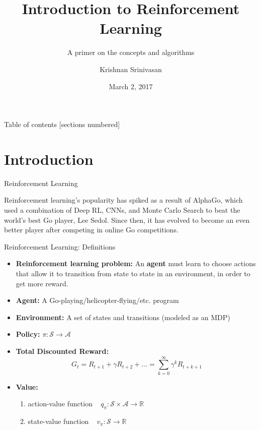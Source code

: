 \documentclass[10pt]{beamer}
\title{Introduction to Reinforcement Learning}
\subtitle{A primer on the concepts and algorithms}
\date{March 2, 2017}
\author{Krishnan Srinivasan}
\institute{Yale University}
\begin{document}
\maketitle

\begin{frame}{Table of contents}
  [sections numbered]
  \tableofcontents[hideallsubsections]
\end{frame}

\section{Introduction}

\begin{frame}{Reinforcement Learning}

  Reinforcement learning's popularity has spiked as a result of AlphaGo,
  which used a combination of Deep RL, CNNs, and Monte Carlo Search to
  beat the world's best Go player, Lee Sedol. Since then, it has evolved
  to become an even better player after competing in online Go competitions.

\end{frame}

\begin{frame}{Reinforcement Learning: Definitions}

  \begin{itemize}
    \item \textbf{Reinforcement learning problem:} An \textbf{agent} must learn to choose actions that allow it to transition from state to state in an environment, in order to get more reward.
    \item \textbf{Agent:} A Go-playing/helicopter-flying/etc. program
    \item \textbf{Environment:} A set of states and transitions (modeled as an MDP)
    \item \textbf{Policy:} $\pi: \mathcal{S} \rightarrow \mathcal{A}$
    \item \textbf{Total Discounted Reward:} $$G_t = R_{t+1} + \gamma R_{t+2} + \ldots = \sum_{k=0}^{\infty} \gamma^k R_{t+k+1}$$
    \item \textbf{Value:}
    \begin{enumerate}
      \item action-value function ~ $q_\pi: \mathcal{S} \times \mathcal{A}
        \rightarrow \mathbb{R}$
      \item state-value function ~ $v_\pi: \mathcal{S} \rightarrow \mathbb{R}$
    \end{enumerate}
  \end{itemize}

\end{frame}
\end{document}
